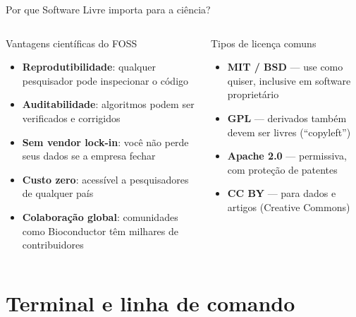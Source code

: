 \begin{frame}[shrink=15]{Por que Software Livre importa para a ciência?}
\begin{columns}
\begin{block}{Vantagens científicas do FOSS}
\begin{itemize}
    \item \textbf{Reprodutibilidade}: qualquer pesquisador pode inspecionar o código
    \item \textbf{Auditabilidade}: algoritmos podem ser verificados e corrigidos
    \item \textbf{Sem vendor lock-in}: você não perde seus dados se a empresa fechar
    \item \textbf{Custo zero}: acessível a pesquisadores de qualquer país
    \item \textbf{Colaboração global}: comunidades como Bioconductor têm milhares de contribuidores
\end{itemize}
\end{block}

\begin{block}{Tipos de licença comuns}
\begin{itemize}
    \item \textbf{MIT / BSD} — use como quiser, inclusive em software proprietário
    \item \textbf{GPL} — derivados também devem ser livres (``copyleft'')
    \item \textbf{Apache 2.0} — permissiva, com proteção de patentes
    \item \textbf{CC BY} — para dados e artigos (Creative Commons)
\end{itemize}
\end{block}

\end{columns}
\end{frame}

\section{Terminal e linha de comando}

